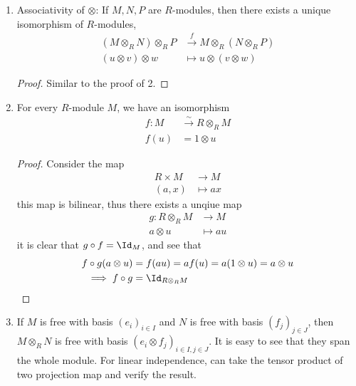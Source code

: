 \begin{remark}
\begin{enumerate}
		\item Associativity of \( \otimes \): If \( M,N,P\) are \( R \)-modules, then there exists a
		      unique isomorphism of \( R \)-modules,
		      \[
			      \begin{aligned}
				      (M\otimes_R N) \otimes_R P & \xrightarrow{f} M \otimes_R (N\otimes_R P) \\
				      (u\otimes v) \otimes w     & \mapsto u \otimes (v\otimes w)
			      \end{aligned}
		      \]
		      \begin{proof}
			      Similar to the proof of 2.
		      \end{proof}

		\item For every \( R \)-module \( M \), we have an isomorphism
		      \begin{align*}
			      f: M & \xrightarrow{\sim} R \otimes_R M \\
			      f(u) & = 1\otimes u
		      \end{align*}

		      \begin{proof}
			      Consider the map
			      \begin{align*}
				      R\times M & \to M      \\
				      (a,x)     & \mapsto ax
			      \end{align*}
			      this map is bilinear, thus there exists a unqiue map
			      \[
				      \begin{aligned}
					      g: R \otimes_R M & \to M      \\
					      a\otimes u       & \mapsto au
				      \end{aligned}
			      \]
			      it is clear that \( g\circ f = \Id_M \), and see that
			      \begin{align*}
				      f\circ g(a\otimes u) & = f(au) = af(u) = a(1\otimes u) = a\otimes u \\
				      \implies f\circ g    & =\Id_{R \otimes_R M}
			      \end{align*}
		      \end{proof}
		\item If \( M \) is free with basis \( (e_i)_{i\in I} \) and \( N \) is free with basis \( (f_j)_{j\in J} \), then
		      \( M\otimes_R N \) is free with basis \( (e_i\otimes f_j)_{i\in I, j\in J} \). It is easy to
		      see that they span the whole module. For linear independence, can take the tensor product of
		      two projection map and verify the result.
	\end{enumerate}
\end{remark}

